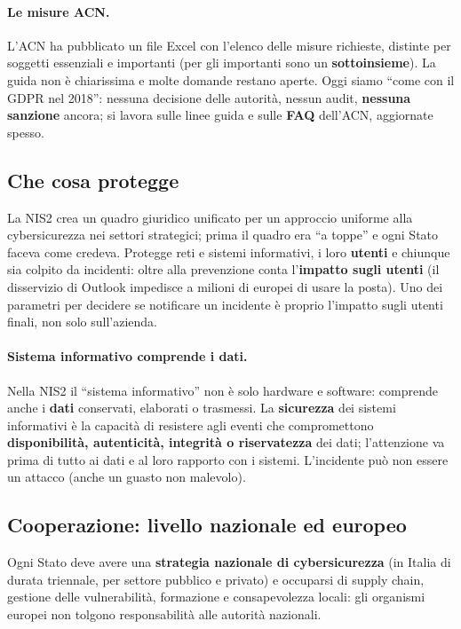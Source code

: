 \paragraph{Le misure ACN.} L'ACN ha pubblicato un file Excel con l'elenco delle misure richieste,
distinte per soggetti essenziali e importanti (per gli importanti sono un \textbf{sottoinsieme}). La
guida non è chiarissima e molte domande restano aperte. Oggi siamo ``come con il GDPR nel 2018'':
nessuna decisione delle autorità, nessun audit, \textbf{nessuna sanzione} ancora; si lavora sulle linee
guida e sulle \textbf{FAQ} dell'ACN, aggiornate spesso.

\subsection{Che cosa protegge}
La NIS2 crea un quadro giuridico unificato per un approccio uniforme alla cybersicurezza nei settori
strategici; prima il quadro era ``a toppe'' e ogni Stato faceva come credeva. Protegge reti e sistemi
informativi, i loro \textbf{utenti} e chiunque sia colpito da incidenti: oltre alla prevenzione conta
l'\textbf{impatto sugli utenti} (il disservizio di Outlook impedisce a milioni di europei di usare la
posta). Uno dei parametri per decidere se notificare un incidente è proprio l'impatto sugli utenti
finali, non solo sull'azienda.

\paragraph{Sistema informativo comprende i dati.} Nella NIS2 il ``sistema informativo'' non è solo
hardware e software: comprende anche i \textbf{dati} conservati, elaborati o trasmessi. La
\textbf{sicurezza} dei sistemi informativi è la capacità di resistere agli eventi che compromettono
\textbf{disponibilità, autenticità, integrità o riservatezza} dei dati; l'attenzione va prima di tutto
ai dati e al loro rapporto con i sistemi. L'incidente può non essere un attacco (anche un guasto non
malevolo).

\subsection{Cooperazione: livello nazionale ed europeo}
Ogni Stato deve avere una \textbf{strategia nazionale di cybersicurezza} (in Italia di durata
triennale, per settore pubblico e privato) e occuparsi di supply chain, gestione delle vulnerabilità,
formazione e consapevolezza locali: gli organismi europei non tolgono responsabilità alle autorità
nazionali.

